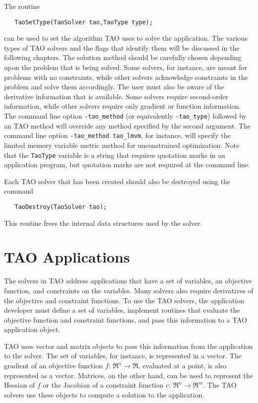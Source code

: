 The routine
\begin{verbatim}
   TaoSetType(TaoSolver tao,TaoType type);
\end{verbatim}
\noindent
can be used to set the algorithm TAO uses to solve the application.
The various types of TAO solvers and the flags that identify them 
will be discussed in the following chapters.
The solution method should be carefully chosen depending upon
the problem that is being solved.  Some solvers, for instance, are meant for
problems with no constraints, while other solvers acknowledge constraints
in the problem and solve them accordingly.
The user must also be aware of the derivative information that is available.
Some solvers require second-order information, while other solvers require
only gradient or function information.
The command line option \texttt{-tao\_method} (or equivalently 
\texttt{-tao\_type}) followed by an TAO method
will override any method specified by the second argument.
The command line option {\tt -tao\_method tao\_lmvm}, for instance,
will specify the limited memory variable metric method for unconstrained
optimization.  Note that the {\tt TaoType} variable is a string that requires
quotation marks in an application program, but quotation marks are not required
at the command line.

Each TAO solver that has been created should also be destroyed using
the command 
\begin{verbatim}
   TaoDestroy(TaoSolver tao);
\end{verbatim}
\noindent 
This routine frees the internal data structures used by the solver.


\section{TAO Applications}
\label{section:taoapplication}
\label{section:petscapp}

The solvers in TAO address applications that have a set of variables, an objective
function, and constraints on the variables.  Many solvers also require derivatives
of the objective and constraint functions.
To use the TAO solvers, the application developer must 
define a set of variables, implement routines that evaluate the 
objective function and constraint functions, and pass this information
to a TAO application object.   

TAO uses vector and matrix objects to pass this information from the
application to the solver.   The set of variables, for instance, is
represented in a vector.
The gradient of an objective function $f: \, \Re^n \to \Re$,
evaluated at a point, is also represented as a vector.
Matrices,  on the other hand,
can be used to represent the Hessian of $f$ or the Jacobian of a constraint
function $c: \, \Re^n \to \Re^m$.  The TAO solvers use
these objects to compute a solution to the application.

